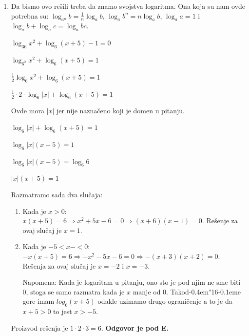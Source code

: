 \documentclass[a4paper,12pt]{report}
\def\dj{d\kern-0.4em\char"16\kern-0.1em}
\begin{document}
\begin{enumerate}[1.]
\item Da bismo ovo re\v{s}ili treba da znamo svojstva logaritma. Ona koja su nam ovde potrebna su: $\log_{a^n} b = \frac{1}{n} \log_a b$, $\log_a b^n = n \log_a b$, $\log_a a = 1$ i  $\log_a b + \log_a c = \log_a bc$.
\begin{center}
\par $ \log_{36} x^{2} + \log_6 (x + 5) -1 = 0$
\par $ \log_{6^2} x^{2} + \log_6 (x + 5) = 1$
\par $ \frac{1}{2} \log_6 x^{2} + \log_6 (x + 5) = 1$
\par $ \frac{1}{2} \cdot 2 \cdot \log_6 |x| + \log_6 (x + 5) = 1$
\end{center}
\par Ovde mora $|x|$ jer nije nazna\v{c}eno koji je domen u pitanju.
\begin{center}
\par $ \log_6 |x| + \log_6 (x + 5) = 1$
\par $ \log_6 |x|(x + 5) = 1$
\par $ \log_6 |x|(x + 5) = \log_6 6$
\par $|x|(x + 5) = 1$
\end{center}
\par Razmatramo sada dva slu\v{c}aja:
\begin{enumerate}[1)]
\item Kada je $x > 0$: $x(x+5) = 6 \Longrightarrow x^2 + 5x -6 = 0 \Longrightarrow (x+6)(x-1)=0$. Re\v{s}enje za ovaj slu\v{c}aj je $x = 1$.
 
\item Kada je $-5 < x- < 0$:  $-x(x+5) = 6 \Longrightarrow -x^2 - 5x -6 = 0 \Longrightarrow -(x+3)(x+2)=0$. Re\v{s}enja za ovaj slu\v{c}aj je $x = -2$ i  $x = -3$.
\par Napomena: Kada je logaritam u pitanju, ono sto je pod njim ne sme biti 0, stoga se samo razmatra kada je $x$ manje od 0. Tako\dj{}e gore imam $log_6 (x+5)$ odakle uzimamo drugo ograni\v{c}enje a to je da $x+5>0$ to jest $ x > -5$.
\end{enumerate}
\par Proizvod re\v{s}enja je $1 \cdot 2 \cdot 3 = 6$. \textbf{Odgovor je pod E.} 



\end{enumerate}
\end{document}
